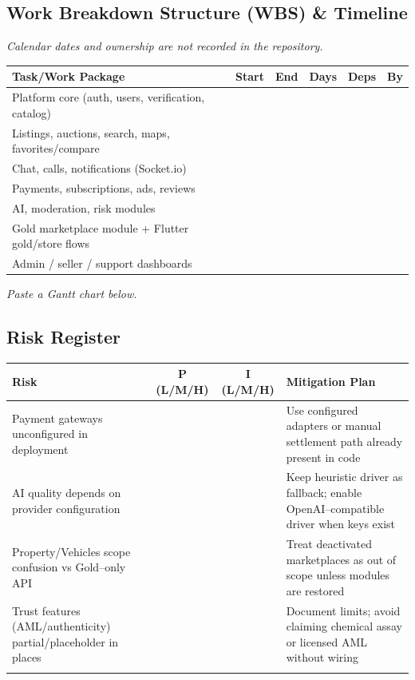 \documentclass[11pt,a4paper]{article}
\begin{document}
\subsection{Work Breakdown Structure (WBS) \& Timeline}

\textit{Calendar dates and ownership are not recorded in the repository.}

\begin{tabularx}{\textwidth}{@{}
  >{\raggedright\arraybackslash}X
  c c c c
  >{\raggedright\arraybackslash}p{2.2cm}@{}}
\toprule
\textbf{Task/Work Package} & \textbf{Start} & \textbf{End} & \textbf{Days} & \textbf{Deps} & \textbf{By} \\
\midrule
Platform core (auth, users, verification, catalog) &  &  &  &  &  \\
Listings, auctions, search, maps, favorites/compare &  &  &  &  &  \\
Chat, calls, notifications (Socket.io) &  &  &  &  &  \\
Payments, subscriptions, ads, reviews &  &  &  &  &  \\
AI, moderation, risk modules &  &  &  &  &  \\
Gold marketplace module + Flutter gold/store flows &  &  &  &  &  \\
Admin / seller / support dashboards &  &  &  &  &  \\
\bottomrule
\end{tabularx}

\vspace{0.4em}
\textit{Paste a Gantt chart below.}

\subsection{Risk Register}

\begin{tabularx}{\textwidth}{@{}
  >{\raggedright\arraybackslash}X
  c c
  >{\raggedright\arraybackslash}X@{}}
\toprule
\textbf{Risk} & \textbf{P (L/M/H)} & \textbf{I (L/M/H)} & \textbf{Mitigation Plan} \\
\midrule
Payment gateways unconfigured in deployment &  &  & Use configured adapters or manual settlement path already present in code \\
\addlinespace
AI quality depends on provider configuration &  &  & Keep heuristic driver as fallback; enable OpenAI--compatible driver when keys exist \\
\addlinespace
Property/Vehicles scope confusion vs Gold--only API &  &  & Treat deactivated marketplaces as out of scope unless modules are restored \\
\addlinespace
Trust features (AML/authenticity) partial/placeholder in places &  &  & Document limits; avoid claiming chemical assay or licensed AML without wiring \\
\addlinespace
 &  &  &  \\
\bottomrule
\end{tabularx}
\end{document}
